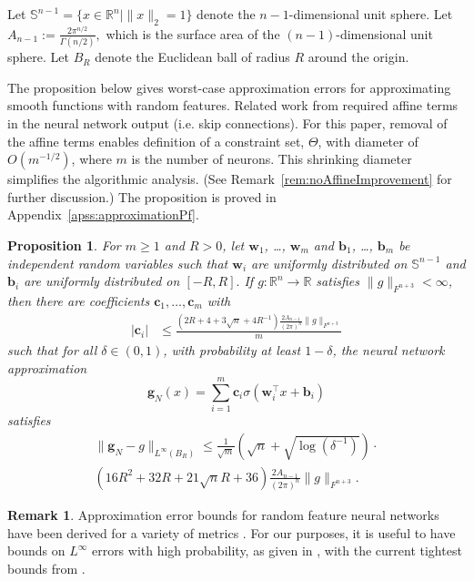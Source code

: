 \documentclass[twoside]{article}
\newtheorem{proposition}{Proposition}
\theoremstyle{definition}
\newtheorem{remark}{Remark}
\newcommand{\R}{\mathbb{R}}
\renewcommand{\S}{\mathbb{S}}
\newcommand{\1}[1]{\scalebox{1.25}{$\mathds{1}$}\left[#1\right]}
\begin{document}
Let $\S^{n-1}=\{x\in\R^n|\|x\|_2=1\}$ denote the $n-1$-dimensional unit sphere.
%
Let $A_{n-1} := \frac{2\pi^{n/2}}{\Gamma(n/2)},$ which is the surface area of the $(n-1)$-dimensional unit sphere. Let $B_R$ denote the Euclidean ball of radius $R$ around the origin. 

The proposition below gives worst-case approximation errors for approximating smooth functions with random features. Related work from \cite{lamperski2024approximation,lamperski2024functiongradientapproximationrandom} required affine terms in the neural network output (i.e. skip connections). For this paper, removal of the affine terms enables definition of a constraint set, $\Theta$, with diameter of $O(m^{-1/2})$, where $m$ is the number of neurons. This shrinking diameter simplifies the algorithmic analysis. (See Remark~\ref{rem:noAffineImprovement} for further discussion.) The proposition is proved  in Appendix~\ref{apss:approximationPf}.

\begin{proposition}
\label{prop:generalApproximation}
  For $m\ge 1$ and $R>0$,  let $\bm{w}_1$, \ldots, $\bm{w}_m$ and $\bm{b}_1$, \ldots, $\bm{b}_m$ be independent random variables  such that $\bm{w}_i$ are uniformly distributed on $\S^{n-1}$ and $\bm{b}_i$ are uniformly distributed on $[-R,R].$ 
    If $g:\R^n\to \R$ satisfies $\|g\|_{F^{n+3}}<\infty$, then
    there are coefficients $\bm{c}_1,\ldots,\bm{c}_m$ with
    \begin{align*}
      |\bm{c}_i| & \le \frac{ \left(2R + 4+3\sqrt{n}  + 4R^{-1}\right)\frac{2A_{n-1}}{(2\pi)^n}
      \|g\|_{F^{n+3}}}{m}
    \end{align*}
    such that for all $\delta \in (0,1)$, with probability at least $1-\delta$, the neural network approximation
    \begin{equation*}
    \bm{g}_N(x)=\sum_{i=1}^m\bm{c}_i \sigma(\bm{w}_i^\top x+\bm{b}_i)
    \end{equation*}
    satisfies
    \begin{gather*}
    \|\bm{g}_N-g\|_{L^{\infty}(B_R)}\le \frac{1}{\sqrt{m}}\left(\sqrt{n}+\sqrt{\log(\delta^{-1})} \right)\cdot \\
\left(
16R^2+32R+21\sqrt{n}R+36
\right)\frac{2A_{n-1}}{(2\pi)^n}\|g\|_{F^{n+3}}.
    \end{gather*}
\end{proposition}   

\begin{remark}
Approximation error bounds for random feature neural networks have been derived for a variety of metrics
\cite{gonon2023approximation,gonon2023random,neufeld2023universal,hsu2021approximation,xu2024priori}. For our purposes, it is useful to have bounds on $L^{\infty}$ errors with high probability, as given in \cite{lamperski2024approximation,lamperski2024functiongradientapproximationrandom,salanevich2023efficient}, with the current tightest bounds from \cite{lamperski2024approximation,lamperski2024functiongradientapproximationrandom}.
\end{remark}
\end{document}
